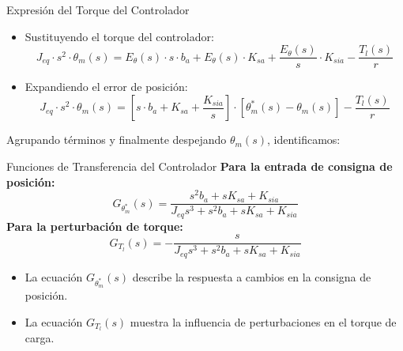 \documentclass[12pt]{beamer}
\begin{document}
\begin{frame}{Expresión del Torque del Controlador}
    \begin{itemize}
        \item Sustituyendo el torque del controlador:
        \begin{equation}
            J_{eq} \cdot s^2 \cdot \theta_m(s) = E_\theta(s) \cdot s \cdot b_a + E_\theta(s) \cdot K_{sa} + \frac{E_\theta(s)}{s} \cdot K_{sia} - \frac{T_l(s)}{r}
        \end{equation}
        \item Expandiendo el error de posición:
        \begin{equation}
            J_{eq} \cdot s^2 \cdot \theta_m(s) = \left[s \cdot b_a + K_{sa} + \frac{K_{sia}}{s}\right] \cdot [\theta_m^*(s) - \theta_m(s)] - \frac{T_l(s)}{r}
        \end{equation}
    \end{itemize}
    Agrupando términos y finalmente despejando $\theta_m(s)$, identificamos:
\end{frame}

\begin{frame}{Funciones de Transferencia del Controlador}
    \textbf{Para la entrada de consigna de posición:}
    \begin{equation}
        G_{\theta^*_m}(s) = \frac{s^2 b_a + s K_{sa} + K_{sia}}{J_{eq} s^3 + s^2 b_a + s K_{sa} + K_{sia}}
    \end{equation}
    \textbf{Para la perturbación de torque:}
    \begin{equation}
        G_{T_l}(s) = -\frac{s}{J_{eq} s^3 + s^2 b_a + s K_{sa} + K_{sia}}
    \end{equation}
    \begin{itemize}
        \item La ecuación $G_{\theta^*_m}(s)$ describe la respuesta a cambios en la consigna de posición.
        \item La ecuación $G_{T_l}(s)$ muestra la influencia de perturbaciones en el torque de carga.
    \end{itemize}
\end{frame}
\end{document}
